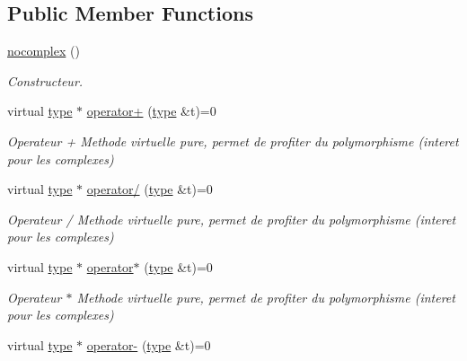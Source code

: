 \subsection*{Public Member Functions}
\begin{DoxyCompactItemize}
\item 
\hypertarget{classnocomplex_a633b5bd1a8681544bb2773605cffed9c}{\hyperlink{classnocomplex_a633b5bd1a8681544bb2773605cffed9c}{nocomplex} ()}\label{classnocomplex_a633b5bd1a8681544bb2773605cffed9c}

\begin{DoxyCompactList}\small\item\em Constructeur. \end{DoxyCompactList}\item 
\hypertarget{classnocomplex_af3d04b00f4f82d3a35cad0ca023093f4}{virtual \hyperlink{classtype}{type} $\ast$ \hyperlink{classnocomplex_af3d04b00f4f82d3a35cad0ca023093f4}{operator+} (\hyperlink{classtype}{type} \&t)=0}\label{classnocomplex_af3d04b00f4f82d3a35cad0ca023093f4}

\begin{DoxyCompactList}\small\item\em Operateur + Methode virtuelle pure, permet de profiter du polymorphisme (interet pour les complexes) \end{DoxyCompactList}\item 
\hypertarget{classnocomplex_a47942bdcc78cfc5d5e867c9f9836a465}{virtual \hyperlink{classtype}{type} $\ast$ \hyperlink{classnocomplex_a47942bdcc78cfc5d5e867c9f9836a465}{operator/} (\hyperlink{classtype}{type} \&t)=0}\label{classnocomplex_a47942bdcc78cfc5d5e867c9f9836a465}

\begin{DoxyCompactList}\small\item\em Operateur / Methode virtuelle pure, permet de profiter du polymorphisme (interet pour les complexes) \end{DoxyCompactList}\item 
\hypertarget{classnocomplex_ac84954cbe0bd9c77eab88c0b97b34c2b}{virtual \hyperlink{classtype}{type} $\ast$ \hyperlink{classnocomplex_ac84954cbe0bd9c77eab88c0b97b34c2b}{operator$\ast$} (\hyperlink{classtype}{type} \&t)=0}\label{classnocomplex_ac84954cbe0bd9c77eab88c0b97b34c2b}

\begin{DoxyCompactList}\small\item\em Operateur $\ast$ Methode virtuelle pure, permet de profiter du polymorphisme (interet pour les complexes) \end{DoxyCompactList}\item 
\hypertarget{classnocomplex_a2005c3a0fcaa1f360561539931ffc578}{virtual \hyperlink{classtype}{type} $\ast$ \hyperlink{classnocomplex_a2005c3a0fcaa1f360561539931ffc578}{operator-\/} (\hyperlink{classtype}{type} \&t)=0}\label{classnocomplex_a2005c3a0fcaa1f360561539931ffc578}


\end{DoxyCompactItemize}
